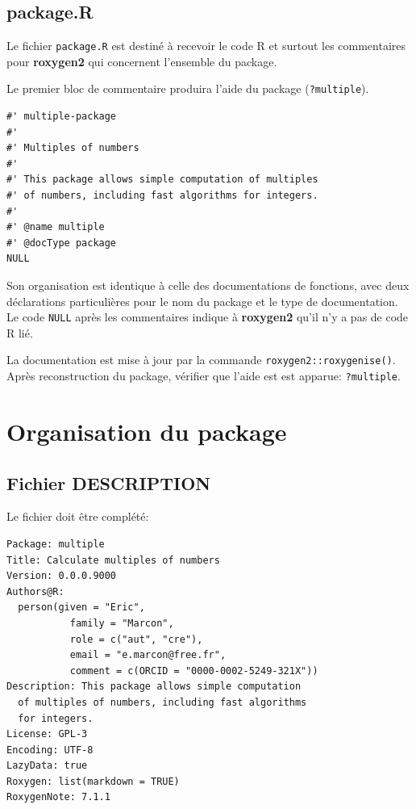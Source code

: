 \documentclass[
  11pt,
  french,
  a4paper,
  extrafontsizes,onecolumn,openright
  ]{memoir}
\begin{document}
\hypertarget{package.r}{%
\subsection{package.R}\label{package.r}}

Le fichier \texttt{package.R} est destiné à recevoir le code R et surtout les commentaires pour \textbf{roxygen2} qui concernent l'ensemble du package.

Le premier bloc de commentaire produira l'aide du package (\texttt{?multiple}).

\begin{verbatim}
#' multiple-package
#'
#' Multiples of numbers
#' 
#' This package allows simple computation of multiples 
#' of numbers, including fast algorithms for integers.
#'
#' @name multiple
#' @docType package
NULL
\end{verbatim}

Son organisation est identique à celle des documentations de fonctions, avec deux déclarations particulières pour le nom du package et le type de documentation.
Le code \texttt{NULL} après les commentaires indique à \textbf{roxygen2} qu'il n'y a pas de code R lié.

La documentation est mise à jour par la commande \texttt{roxygen2::roxygenise()}.
Après reconstruction du package, vérifier que l'aide est est apparue: \texttt{?multiple}.

\hypertarget{organisation-du-package}{%
\section{Organisation du package}\label{organisation-du-package}}

\hypertarget{sec:package-description}{%
\subsection{Fichier DESCRIPTION}\label{sec:package-description}}

Le fichier doit être complété:

\begin{verbatim}
Package: multiple
Title: Calculate multiples of numbers
Version: 0.0.0.9000
Authors@R: 
  person(given = "Eric",
           family = "Marcon",
           role = c("aut", "cre"),
           email = "e.marcon@free.fr",
           comment = c(ORCID = "0000-0002-5249-321X"))
Description: This package allows simple computation
  of multiples of numbers, including fast algorithms
  for integers.
License: GPL-3
Encoding: UTF-8
LazyData: true
Roxygen: list(markdown = TRUE)
RoxygenNote: 7.1.1
\end{verbatim}
\end{document}
